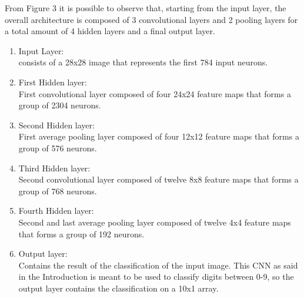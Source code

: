 \documentclass[a4paper]{report}
\begin{document}
From Figure 3 it is possible to observe that, starting from the input layer, the overall architecture is composed of 3 convolutional layers and 2 pooling layers for a total amount of 4 hidden layers and a final output layer.
\begin{enumerate}
\item Input Layer: \\
consists of a 28x28 image that represents the first 784 input neurons.
\item First Hidden layer: \\
First convolutional layer composed of four 24x24 feature maps that forms a group of 2304 neurons.
\item Second Hidden layer:\\
First average pooling layer composed of four 12x12 feature maps that forms a group of 576 neurons.
\item Third Hidden layer:\\
Second convolutional layer composed of twelve 8x8 feature maps that forms a group of 768 neurons.
\item Fourth Hidden layer:\\
Second and last average pooling layer composed of twelve 4x4 feature maps that forms a group of 192 neurons.
\item Output layer:\\
Contains the result of the classification of the input image. This CNN as said in the Introduction is meant to be used to classify digits between 0-9, so the output layer contains the classification on a 10x1 array.
\end{enumerate}
\end{document}
